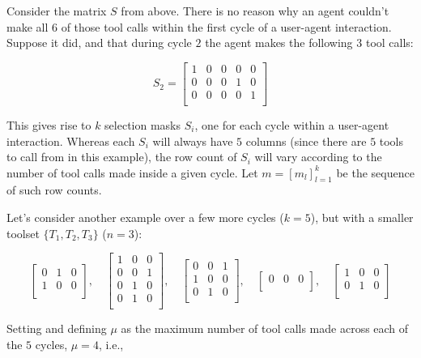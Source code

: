 \documentclass{article}
\begin{document}
Consider the matrix $S$ from above. There is no reason why an agent couldn't make all $6$ of those tool calls within the first cycle of a user-agent interaction. Suppose it did, and that during cycle $2$ the agent makes the following $3$ tool calls:

\[
S_2 =
\begin{bmatrix}
1 & 0 & 0 & 0 & 0 \\
0 & 0 & 0 & 1 & 0 \\
0 & 0 & 0 & 0 & 1 \\
\end{bmatrix}
\]

This gives rise to $k$ selection masks $S_i$, one for each cycle within a user-agent interaction. Whereas each $S_i$ will always have $5$ columns (since there are $5$ tools to call from in this example), the row count of $S_i$ will vary according to the number of tool calls made inside a given cycle. Let $m = [m_l]_{l=1}^k$ be the sequence of such row counts.

Let's consider another example over a few more cycles ($k=5$), but with a smaller toolset $\{ T_1, T_2, T_3 \}$ ($n=3$):

\[
\begin{bmatrix}
0 & 1 & 0 \\
1 & 0 & 0 \\
\end{bmatrix}, \quad
\begin{bmatrix}
1 & 0 & 0 \\
0 & 0 & 1 \\
0 & 1 & 0 \\
0 & 1 & 0 \\
\end{bmatrix}, \quad
\begin{bmatrix}
0 & 0 & 1 \\
1 & 0 & 0 \\
0 & 1 & 0 \\
\end{bmatrix}, \quad
\begin{bmatrix}
0 & 0 & 0 \\
\end{bmatrix}, \quad
\begin{bmatrix}
1 & 0 & 0 \\
0 & 1 & 0 \\
\end{bmatrix}
\]

Setting and defining $\mu$ as the maximum number of tool calls made across each of the $5$ cycles, $\mu = 4$, i.e.,
\end{document}
